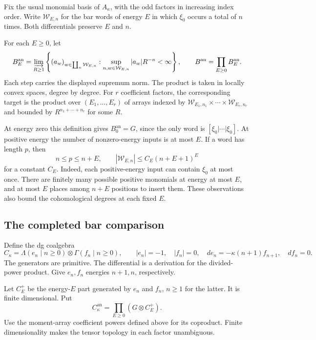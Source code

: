 Fix the usual monomial basis of \(A_\kappa\), with the odd factors
in increasing index order. Write \(\mathcal W_{E,n}\) for the bar
words of energy \(E\) in which \(\xi_0\) occurs a total of \(n\)
times. Both differentials preserve \(E\) and \(n\).

\begin{definition}\label{cbc:rc:an:def:bar-growth}
For each \(E\geq0\), let
\[
 B^{\mathrm{an}}_E
 =\varinjlim_{R\geq1}
 \left\{(a_w)_{w\in\coprod_n\mathcal W_{E,n}}:
       \sup_{n,w\in\mathcal W_{E,n}}|a_w|R^{-n}<\infty\right\},
 \qquad B^{\mathrm{an}}=\prod_{E\geq0}B^{\mathrm{an}}_E.
\]
Each step carries the displayed supremum norm. The product is taken
in locally convex spaces, degree by degree. For \(r\) coefficient
factors, the corresponding target is the product over
\((E_1,\ldots,E_r)\) of arrays indexed by
\(\mathcal W_{E_1,n_1}\times\cdots\times\mathcal W_{E_r,n_r}\)
and bounded by \(R^{n_1+\cdots+n_r}\) for some \(R\).
\end{definition}

At energy zero this definition gives \(B^{\mathrm{an}}_0=G\), since
the only word is \([\xi_0|\cdots|\xi_0]\). At positive energy the
number of nonzero-energy inputs is at most \(E\). If a word has
length \(p\), then
\begin{equation}\label{cbc:rc:an:eq:length}
 n\leq p\leq n+E,\qquad
 |\mathcal W_{E,n}|\leq C_E(n+E+1)^E
\end{equation}
for a constant \(C_E\). Indeed, each positive-energy input can contain
\(\xi_0\) at most once. There are finitely many possible positive
monomials at energy at most \(E\), and at most \(E\) places among
\(n+E\) positions to insert them. These observations also bound the
cohomological degrees at each fixed \(E\).

\subsection{The completed bar comparison}

Define the dg coalgebra
\[
 C_\kappa=\Lambda(e_n\mid n\geq0)\otimes
                 \Gamma(f_n\mid n\geq0),\qquad
 |e_n|=-1,\quad |f_n|=0,
 \quad de_n=-\kappa(n+1)f_{n+1},\quad df_n=0.
\]
The generators are primitive. The differential is a derivation for
the divided-power product. Give \(e_n,f_n\) energies \(n+1,n\),
respectively.

Let \(C^+_E\) be the energy-\(E\) part generated by
\(e_n\) and \(f_n\), \(n\geq1\) for the latter. It is finite
dimensional. Put
\[
 C^{\mathrm{an}}_\kappa
       =\prod_{E\geq0}(G\otimes C^+_E).
\]
Use the moment-array coefficient powers defined above for its
coproduct. Finite dimensionality makes the tensor topology in each
factor unambiguous.

